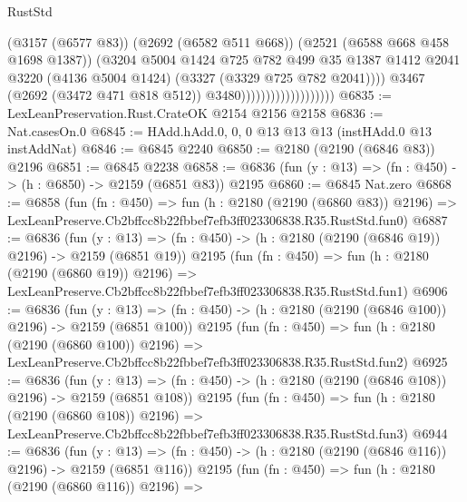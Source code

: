 \begin{lexlean}{RustStd}
\begin{coremodule}
                                            (@3157 (@6577 @83))
                                            (@2692 (@6582 @511 @668))
                                            (@2521 (@6588 @668 @458 @1698 @1387))
                                            (@3204
                                              @5004
                                              @1424
                                              @725
                                              @782
                                              @499
                                              @35
                                              @1387
                                              @1412
                                              @2041
                                              @3220
                                              (@4136 @5004 @1424)
                                              (@3327 (@3329 @725 @782 @2041))))
                                          @3467
                                          (@2692 (@3472 @471 @818 @512))
                                          @3480)))))))))))))))))))
@6835 := LexLeanPreservation.Rust.CrateOK @2154 @2156 @2158
@6836 := Nat.casesOn.{0}
@6845 := HAdd.hAdd.{0, 0, 0} @13 @13 @13 (instHAdd.{0} @13 instAddNat)
@6846 := @6845 @2240
@6850 := @2180 (@2190 (@6846 @83)) @2196
@6851 := @6845 @2238
@6858 := @6836 (fun (y : @13) => (fn : @450) -> (h : @6850) -> @2159 (@6851 @83)) @2195
@6860 := @6845 Nat.zero
@6868 := @6858
    (fun (fn : @450) =>
    fun (h : @2180 (@2190 (@6860 @83)) @2196) =>
    LexLeanPreserve.Cb2bffcc8b22fbbef7efb3ff023306838.R35.RustStd.fun0)
@6887 := @6836
    (fun (y : @13) => (fn : @450) -> (h : @2180 (@2190 (@6846 @19)) @2196) -> @2159 (@6851 @19))
    @2195
    (fun (fn : @450) =>
    fun (h : @2180 (@2190 (@6860 @19)) @2196) =>
    LexLeanPreserve.Cb2bffcc8b22fbbef7efb3ff023306838.R35.RustStd.fun1)
@6906 := @6836
    (fun (y : @13) => (fn : @450) -> (h : @2180 (@2190 (@6846 @100)) @2196) -> @2159 (@6851 @100))
    @2195
    (fun (fn : @450) =>
    fun (h : @2180 (@2190 (@6860 @100)) @2196) =>
    LexLeanPreserve.Cb2bffcc8b22fbbef7efb3ff023306838.R35.RustStd.fun2)
@6925 := @6836
    (fun (y : @13) => (fn : @450) -> (h : @2180 (@2190 (@6846 @108)) @2196) -> @2159 (@6851 @108))
    @2195
    (fun (fn : @450) =>
    fun (h : @2180 (@2190 (@6860 @108)) @2196) =>
    LexLeanPreserve.Cb2bffcc8b22fbbef7efb3ff023306838.R35.RustStd.fun3)
@6944 := @6836
    (fun (y : @13) => (fn : @450) -> (h : @2180 (@2190 (@6846 @116)) @2196) -> @2159 (@6851 @116))
    @2195
    (fun (fn : @450) =>
    fun (h : @2180 (@2190 (@6860 @116)) @2196) =>

\end{coremodule}
\end{lexlean}
